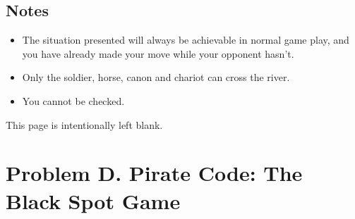 \documentclass[12pt,a4paper]{article}
\newcommand*{\blankpage}{%
\newpage
\vspace*{\fill}
{\centering \huge This page is intentionally left blank.\par}
\vspace{\fill}
\newpage}
\begin{document}
\subsection*{\fontsize{16}{12}Notes}
\begin{itemize}
\item  The situation presented will always be achievable in normal game play, and you have already made your move while your opponent hasn't.
\item Only the soldier, horse, canon and chariot can
cross the river.
\item You cannot be checked.
\end{itemize}

\blankpage

\section*{\fontsize{18}{12}Problem D. Pirate Code: The Black Spot Game}
\end{document}

